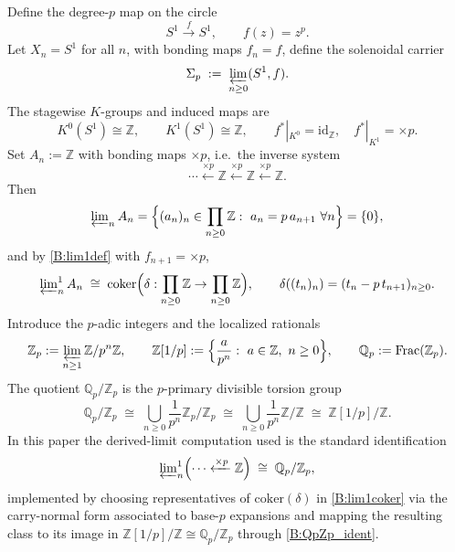 \documentclass[11pt]{article}
\theoremstyle{remark}
\begin{document}
Define the degree-$p$ map on the circle
\begin{equation}
S^{1}\xrightarrow{\,f\,} S^{1},\qquad f(z)=z^{p}.
\label{B:circlemap}
\end{equation}
Let $X_n=S^{1}$ for all $n$, with bonding maps $f_n=f$, define the solenoidal carrier
\begin{equation}
\Sigma_{p}\;:=\;\varprojlim_{n\ge 0}(S^{1},f).
\label{B:sigma}
\end{equation}
The stagewise $K$-groups and induced maps are
\begin{equation}
K^{0}(S^{1})\cong \mathbb{Z},\qquad K^{1}(S^{1})\cong \mathbb{Z},
\qquad
f^\ast|_{K^{0}}=\mathrm{id}_{\mathbb{Z}},\quad f^\ast|_{K^{1}}=\times p.
\label{B:Kcircle}
\end{equation}
Set $A_n:=\mathbb{Z}$ with bonding maps $\times p$, i.e.\ the inverse system
\begin{equation}
\cdots \xleftarrow{\times p}\mathbb{Z}\xleftarrow{\times p}\mathbb{Z}\xleftarrow{\times p}\mathbb{Z}.
\label{B:Zsystem}
\end{equation}
Then
\begin{equation}
\varprojlim\nolimits_{n}A_n
=\Bigl\{(a_n)_n\in\prod_{n\ge 0}\mathbb{Z}:\ a_n=p\,a_{n+1}\ \forall n\Bigr\}
=\{0\},
\label{B:limZ}
\end{equation}
and by \eqref{B:lim1def} with $f_{n+1}=\times p$,
\begin{equation}
\varprojlim\nolimits^{1}_{n}A_n
\;\cong\;
\mathrm{coker}\Bigl(\delta:\prod_{n\ge 0}\mathbb{Z}\to \prod_{n\ge 0}\mathbb{Z}\Bigr),
\qquad
\delta((t_n)_n)=(t_n-p\,t_{n+1})_{n\ge 0}.
\label{B:lim1coker}
\end{equation}
Introduce the $p$-adic integers and the localized rationals
\begin{equation}
\mathbb{Z}_{p}:=\varprojlim_{n\ge 1}\mathbb{Z}/p^{n}\mathbb{Z},
\qquad
\mathbb{Z}[1/p]:=\Bigl\{\frac{a}{p^{n}}:\ a\in\mathbb{Z},\ n\ge 0\Bigr\},
\qquad
\mathbb{Q}_{p}:=\mathrm{Frac}(\mathbb{Z}_{p}).
\label{B:ZpQp}
\end{equation}
The quotient $\mathbb{Q}_{p}/\mathbb{Z}_{p}$ is the $p$-primary divisible torsion group
\begin{equation}
\mathbb{Q}_{p}/\mathbb{Z}_{p}
\;\cong\;
\bigcup_{n\ge 0}\frac{1}{p^{n}}\mathbb{Z}_{p}\Big/\mathbb{Z}_{p}
\;\cong\;
\bigcup_{n\ge 0}\frac{1}{p^{n}}\mathbb{Z}\Big/\mathbb{Z}
\;\cong\;
\mathbb{Z}[1/p]/\mathbb{Z}.
\label{B:QpZp_ident}
\end{equation}
In this paper the derived-limit computation used is the standard identification
\begin{equation}
\varprojlim\nolimits^{1}_{n}\Bigl(\cdots \xleftarrow{\times p}\mathbb{Z}\Bigr)
\;\cong\;
\mathbb{Q}_{p}/\mathbb{Z}_{p},
\label{B:lim1Z_QpZp}
\end{equation}
implemented by choosing representatives of $\mathrm{coker}(\delta)$ in \eqref{B:lim1coker} via the carry-normal form associated to base-$p$ expansions and mapping the resulting class to its image in $\mathbb{Z}[1/p]/\mathbb{Z}\cong\mathbb{Q}_{p}/\mathbb{Z}_{p}$ through \eqref{B:QpZp_ident}.
\end{document}
